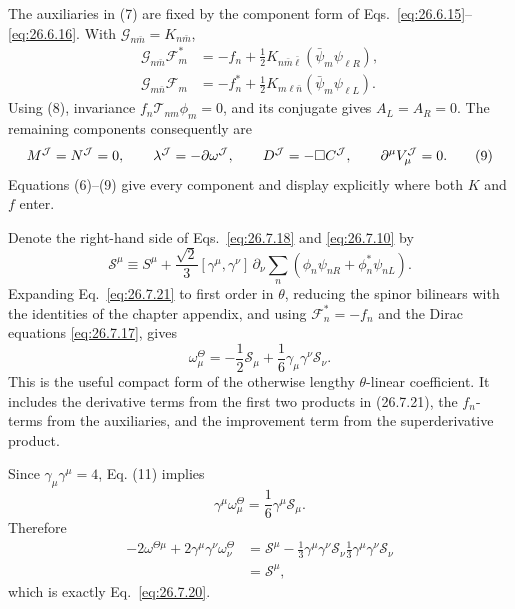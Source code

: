 \begin{enumerate}
  The auxiliaries in (7) are fixed by the component form of
  Eqs.~\eqref{eq:26.6.15}--\eqref{eq:26.6.16}.  With
  \(\mathcal G_{n\bar m}=K_{n\bar m}\),
  \[
  \begin{aligned}
    \mathcal G_{n\bar m}\mathcal F_m^*
      &=-f_n+\frac12K_{n\bar m\bar\ell}
        (\bar\psi_m\psi_{\ell R}),\\
    \mathcal G_{m\bar n}\mathcal F_m
      &=-f_n^*+\frac12K_{m\ell\bar n}
        (\bar\psi_m\psi_{\ell L}).
  \end{aligned}
  \tag{8}
  \]
  Using (8), invariance
  \(f_n\mathcal T_{nm}\phi_m=0\), and its conjugate gives
  \(A_L=A_R=0\).  The remaining components consequently are
  \[
    M^{\mathcal J}=N^{\mathcal J}=0,\qquad
    \lambda^{\mathcal J}=-\sl{\partial}\omega^{\mathcal J},\qquad
    D^{\mathcal J}=-\Box C^{\mathcal J},
    \qquad \partial^\mu V_\mu^{\mathcal J}=0.
    \tag{9}
  \]
  Equations (6)--(9) give every component and display explicitly where both
  \(K\) and \(f\) enter.

  Denote the right-hand side of Eqs.~\eqref{eq:26.7.18} and
  \eqref{eq:26.7.10} by
  \[
    \mathscr S^\mu\equiv S^\mu+
      \frac{\sqrt2}{3}[\gamma^\mu,\gamma^\nu]\,
      \partial_\nu\sum_n
      (\phi_n\psi_{nR}+\phi_n^*\psi_{nL}).
    \tag{10}
  \]
  Expanding Eq.~\eqref{eq:26.7.21} to first order in \(\theta\), reducing
  the spinor bilinears with the identities of the chapter appendix, and
  using
  \(\mathcal F_n^*=-f_n\) and the Dirac equations
  \eqref{eq:26.7.17}, gives
  \[
    \omega_\mu^\Theta
      =-\frac12\mathscr S_\mu
       +\frac16\gamma_\mu\gamma^\nu\mathscr S_\nu .
    \tag{11}
  \]
  This is the useful compact form of the otherwise lengthy
  \(\theta\)-linear coefficient.  It includes the derivative terms from the
  first two products in (26.7.21), the \(f_n\)-terms from the auxiliaries,
  and the improvement term from the superderivative product.

  Since \(\gamma_\mu\gamma^\mu=4\), Eq. (11) implies
  \[
    \gamma^\mu\omega_\mu^\Theta
      =\frac16\gamma^\mu\mathscr S_\mu .
  \]
  Therefore
  \[
  \begin{aligned}
    -2\omega^{\Theta\mu}
      +2\gamma^\mu\gamma^\nu\omega_\nu^\Theta
    &=
      \mathscr S^\mu-\frac13\gamma^\mu\gamma^\nu\mathscr S_\nu
      \frac13\gamma^\mu\gamma^\nu\mathscr S_\nu\\
    &=\mathscr S^\mu,
  \end{aligned}
  \]
  which is exactly Eq.~\eqref{eq:26.7.20}.
\end{enumerate}
